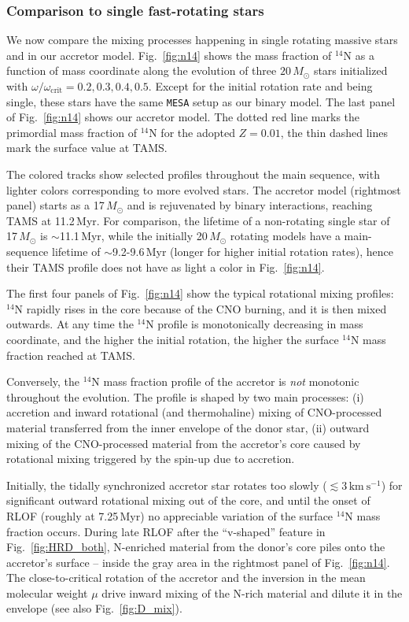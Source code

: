 \documentclass[twocolumn,twocolappendix,trackchanges]{aastex63}
\newcommand{\kms}{{\mathrm{km\ s^{-1}}}}
\DeclareRobustCommand{\Figref}[1]{Fig.~\ref{#1}}
\begin{document}
\subsubsection{Comparison to single fast-rotating stars}
\label{sec:mix_comparison_single}

We now compare the mixing processes
happening in single rotating massive stars and in our accretor
model. \Figref{fig:n14} shows the mass fraction of $^{14}\mathrm{N}$
as a function of mass coordinate along the evolution of three
$20\,M_\odot$ stars initialized with
$\omega/\omega_\mathrm{crit}=0.2,0.3,0.4,0.5$. Except for the initial rotation rate and
being single, these stars have the same \texttt{MESA}
setup as our binary model. The last panel of \Figref{fig:n14} shows
our accretor model. The dotted red line marks the primordial mass
fraction of $^{14}\mathrm{N}$ for the adopted $Z=0.01$, the thin
dashed lines mark the surface value at TAMS.


The colored tracks show selected profiles throughout the main
sequence, with lighter colors corresponding to more evolved stars. The
accretor model (rightmost panel) starts as a 17$\,M_\odot$ and is
rejuvenated by binary interactions, reaching TAMS at
11.2\,Myr. For comparison, the lifetime of a non-rotating single star
of 17\,$M_\odot$ is $\sim$11.1\,Myr, while the initially 20\,$M_\odot$
rotating models have a main-sequence lifetime of $\sim$9.2-9.6\,Myr (longer
for higher initial rotation rates), hence their TAMS profile does not
have as light a color in \Figref{fig:n14}.

The first four panels of \Figref{fig:n14} show the typical rotational
mixing profiles: $^{14}\mathrm{N}$ rapidly rises in the core because
of the CNO burning, and it is then mixed outwards. At any time
the $^{14}\mathrm{N}$ profile is monotonically decreasing in mass
coordinate, and the higher the initial rotation, the higher the
surface $^{14}\mathrm{N}$ mass fraction reached at TAMS.

Conversely, the $^{14}\mathrm{N}$ mass fraction profile of the
accretor is \emph{not} monotonic throughout the evolution.  The
profile is shaped by two main processes: (i) accretion and inward
rotational (and thermohaline) mixing of CNO-processed material
transferred from the inner envelope of the donor star, (ii) outward
mixing of the CNO-processed material from the accretor's core caused
by rotational mixing triggered by the spin-up due to accretion.

Initially, the tidally synchronized accretor star
rotates too slowly ($\lesssim 3\,\kms$) for significant outward rotational mixing out of
the core, and until the onset of RLOF (roughly at 7.25\,Myr) no appreciable variation of the
surface $^{14}\mathrm{N}$ mass fraction occurs. During late RLOF after the
``v-shaped'' feature in \Figref{fig:HRD_both}, N-enriched material from the
donor's core piles onto the accretor's surface -- inside the gray area in
the rightmost panel of \Figref{fig:n14}. The close-to-critical
rotation of the accretor and the inversion in the mean molecular
weight $\mu$ drive inward mixing of
the N-rich material and dilute it in the envelope (see also \Figref{fig:D_mix}).
\end{document}
